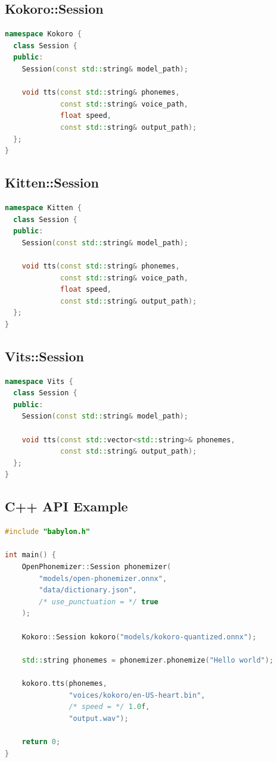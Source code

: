 \documentclass[12pt,a4paper]{article}
\begin{document}
\subsection{Kokoro::Session}

\begin{lstlisting}[language=c++]
namespace Kokoro {
  class Session {
  public:
    Session(const std::string& model_path);

    void tts(const std::string& phonemes,
             const std::string& voice_path,
             float speed,
             const std::string& output_path);
  };
}
\end{lstlisting}

\subsection{Kitten::Session}

\begin{lstlisting}[language=c++]
namespace Kitten {
  class Session {
  public:
    Session(const std::string& model_path);

    void tts(const std::string& phonemes,
             const std::string& voice_path,
             float speed,
             const std::string& output_path);
  };
}
\end{lstlisting}

\subsection{Vits::Session}

\begin{lstlisting}[language=c++]
namespace Vits {
  class Session {
  public:
    Session(const std::string& model_path);

    void tts(const std::vector<std::string>& phonemes,
             const std::string& output_path);
  };
}
\end{lstlisting}

\subsection{C++ API Example}

\begin{lstlisting}[language=c++]
#include "babylon.h"

int main() {
    OpenPhonemizer::Session phonemizer(
        "models/open-phonemizer.onnx",
        "data/dictionary.json",
        /* use_punctuation = */ true
    );

    Kokoro::Session kokoro("models/kokoro-quantized.onnx");

    std::string phonemes = phonemizer.phonemize("Hello world");

    kokoro.tts(phonemes,
               "voices/kokoro/en-US-heart.bin",
               /* speed = */ 1.0f,
               "output.wav");

    return 0;
}
\end{lstlisting}
\end{document}
